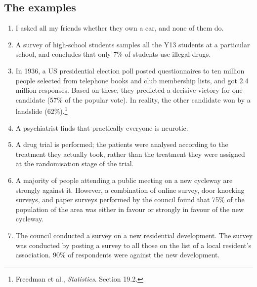 \subsection*{The examples}
\begin{enumerate}
  \item I asked all my friends whether they own a car, and none of them do.
  \item A survey of high-school students samples all the Y13 students at a particular school, and concludes that only
        7\% of students use illegal drugs.
  \item In 1936, a US presidential election poll posted questionnaires to ten million people selected from telephone
        books and club membership lists, and got 2.4 million responses. Based on these, they predicted a decisive
        victory for one candidate (57\% of the popular vote). In reality, the other candidate won by a landslide (62\%).\footnote{Freedman et al., \emph{Statistics}. Section 19.2.}
  \item A psychiatrist finds that practically everyone is neurotic.
  \item A drug trial is performed; the patients were analysed according to the treatment they actually took, rather
        than the treatment they were assigned at the randomisation stage of the trial.
  \item A majority of people attending a public meeting on a new cycleway are strongly against it. However, a combination of online
        survey, door knocking surveys, and paper surveys performed by the council found that 75\% of the population of the area was
        either in favour or strongly in favour of the new cycleway.
  \item The council conducted a survey on a new residential development. The survey was conducted by posting a survey to all those on the list of
        a local resident's association. 90\% of respondents were against the new development.
\end{enumerate}

